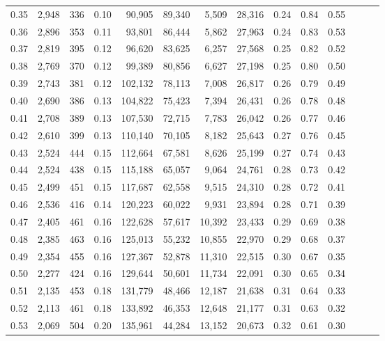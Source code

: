 \begin{tabular}{rrrrrrrrrrrrrr}
0.35 &  2,948 &  336 &  0.10 &   90,905 &   89,340 &   5,509 &  28,316 &  0.24 &  0.84 &      0.55 \\
0.36 &  2,896 &  353 &  0.11 &   93,801 &   86,444 &   5,862 &  27,963 &  0.24 &  0.83 &      0.53 \\
0.37 &  2,819 &  395 &  0.12 &   96,620 &   83,625 &   6,257 &  27,568 &  0.25 &  0.82 &      0.52 \\
0.38 &  2,769 &  370 &  0.12 &   99,389 &   80,856 &   6,627 &  27,198 &  0.25 &  0.80 &      0.50 \\
0.39 &  2,743 &  381 &  0.12 &  102,132 &   78,113 &   7,008 &  26,817 &  0.26 &  0.79 &      0.49 \\
0.40 &  2,690 &  386 &  0.13 &  104,822 &   75,423 &   7,394 &  26,431 &  0.26 &  0.78 &      0.48 \\
0.41 &  2,708 &  389 &  0.13 &  107,530 &   72,715 &   7,783 &  26,042 &  0.26 &  0.77 &      0.46 \\
0.42 &  2,610 &  399 &  0.13 &  110,140 &   70,105 &   8,182 &  25,643 &  0.27 &  0.76 &      0.45 \\
0.43 &  2,524 &  444 &  0.15 &  112,664 &   67,581 &   8,626 &  25,199 &  0.27 &  0.74 &      0.43 \\
0.44 &  2,524 &  438 &  0.15 &  115,188 &   65,057 &   9,064 &  24,761 &  0.28 &  0.73 &      0.42 \\
0.45 &  2,499 &  451 &  0.15 &  117,687 &   62,558 &   9,515 &  24,310 &  0.28 &  0.72 &      0.41 \\
0.46 &  2,536 &  416 &  0.14 &  120,223 &   60,022 &   9,931 &  23,894 &  0.28 &  0.71 &      0.39 \\
0.47 &  2,405 &  461 &  0.16 &  122,628 &   57,617 &  10,392 &  23,433 &  0.29 &  0.69 &      0.38 \\
0.48 &  2,385 &  463 &  0.16 &  125,013 &   55,232 &  10,855 &  22,970 &  0.29 &  0.68 &      0.37 \\
0.49 &  2,354 &  455 &  0.16 &  127,367 &   52,878 &  11,310 &  22,515 &  0.30 &  0.67 &      0.35 \\
0.50 &  2,277 &  424 &  0.16 &  129,644 &   50,601 &  11,734 &  22,091 &  0.30 &  0.65 &      0.34 \\
0.51 &  2,135 &  453 &  0.18 &  131,779 &   48,466 &  12,187 &  21,638 &  0.31 &  0.64 &      0.33 \\
0.52 &  2,113 &  461 &  0.18 &  133,892 &   46,353 &  12,648 &  21,177 &  0.31 &  0.63 &      0.32 \\
0.53 &  2,069 &  504 &  0.20 &  135,961 &   44,284 &  13,152 &  20,673 &  0.32 &  0.61 &      0.30 \\

\end{tabular}
